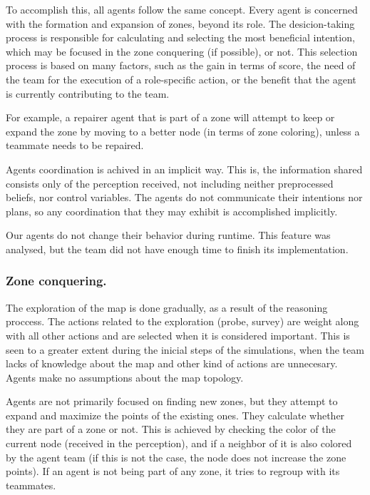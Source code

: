 \documentclass{llncs2e/llncs}
\begin{document}
    To accomplish this, all agents follow the same concept. Every agent is concerned 
    with the formation and expansion of zones, beyond its role.
    The desicion-taking process is responsible for calculating and selecting the
    most beneficial intention, which may be focused in the zone conquering (if possible),
    or not.
    This selection process is based on many factors, such as the gain in terms 
    of score, the need of the team for the execution of a role-specific action, or
    the benefit that the agent is currently contributing to the team. 
    
    For example, a repairer agent that is part of a zone will attempt to keep or
    expand the zone by moving to a better node (in terms of zone coloring), 
    unless a teammate needs to be repaired.
    
    Agents coordination is achived in an implicit way. This is, the information
    shared consists only of the perception received, not including neither 
    preprocessed beliefs, nor control variables. The agents do not communicate
    their intentions nor plans, so any coordination that they may exhibit is 
    accomplished implicitly.

    Our agents do not change their behavior during runtime. This feature was 
    analysed, but the team did not have enough time to finish its implementation.
    
\subsubsection{Zone conquering.}
    
    The exploration of the map is done gradually, as a result of the reasoning 
    proccess. The actions related to the exploration (probe, survey) are weight 
    along with all other actions and are selected when it is considered important. 
    This is seen to a greater extent during the inicial steps of the simulations, 
    when the team lacks of knowledge about the map and other kind of actions are 
    unnecesary. Agents make no assumptions about the map topology.

    Agents are not primarily focused on finding new zones, but they attempt to 
    expand and maximize the points of the existing ones.    
    They calculate whether they are part of a zone or not. This is achieved
    by checking the color of the current node (received in the perception), and if
    a neighbor of it is also colored by the agent team (if this is not the case, the 
    node does not increase the zone points).
    If an agent is not being part of any zone, it tries to regroup with its 
    teammates. 
\end{document}
